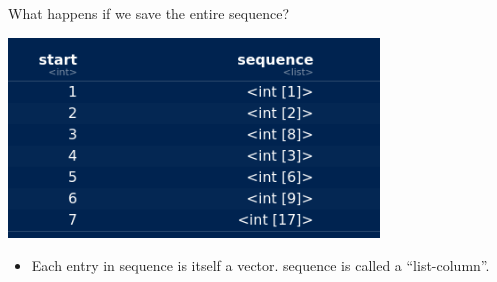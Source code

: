 \documentclass[ignorenonframetext,]{beamer}
\newenvironment{Shaded}{\begin{snugshade}}{\end{snugshade}}
\newcommand{\DataTypeTok}[1]{\textcolor[rgb]{0.13,0.29,0.53}{#1}}
\newcommand{\DecValTok}[1]{\textcolor[rgb]{0.00,0.00,0.81}{#1}}
\newcommand{\KeywordTok}[1]{\textcolor[rgb]{0.13,0.29,0.53}{\textbf{#1}}}
\newcommand{\NormalTok}[1]{#1}
\newcommand{\OperatorTok}[1]{\textcolor[rgb]{0.81,0.36,0.00}{\textbf{#1}}}
\newcommand{\StringTok}[1]{\textcolor[rgb]{0.31,0.60,0.02}{#1}}
\providecommand{\tightlist}{%
  \setlength{\itemsep}{0pt}\setlength{\parskip}{0pt}}
\begin{document}
\begin{frame}[fragile]{What happens if we save the entire sequence?}
\protect\hypertarget{what-happens-if-we-save-the-entire-sequence}{}

\begin{Shaded}
\end{Shaded}

\includegraphics[width=\textwidth,height=2.08333in]{Screenshot_2019-05-07_13-45-12.png}

\begin{itemize}
\tightlist
\item
  Each entry in sequence is itself a vector. sequence is called a
  ``list-column''.
\end{itemize}

\end{frame}
\end{document}
